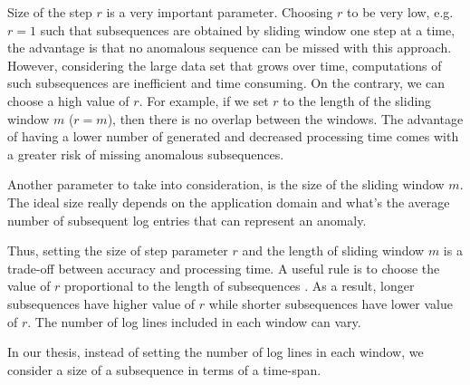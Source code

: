 Size of the step $r$ is a very important parameter. Choosing $r$ to be very low, e.g. $r = 1$ such that subsequences are obtained by sliding window one step at a time, the advantage is that no anomalous sequence can be missed with this approach. However, considering the large data set that grows over time, computations of such subsequences are inefficient and time consuming. On the contrary, we can choose a high value of $r$. For example, if we set $r$ to the length of the sliding window $m$ ($r = m$), then there is no overlap between the windows. The advantage of having a lower number of generated and decreased processing time comes with a greater risk of missing anomalous subsequences. 

Another parameter to take into consideration, is the size of the sliding window $m$. The ideal size really depends on the application domain and what's the average number of subsequent log entries that can represent an anomaly. 

Thus, setting the size of step parameter $r$ and the length of sliding window $m$ is a trade-off between accuracy and processing time. A useful rule is to choose the value of $r$ proportional to the length of subsequences \cite{izakian2013}. As a result, longer subsequences have higher value of $r$ while shorter subsequences have lower value of $r$. The number of log lines included in each window can vary. 

In our thesis, instead of setting the number of log lines in each window, we consider a size of a subsequence in terms of a time-span.

